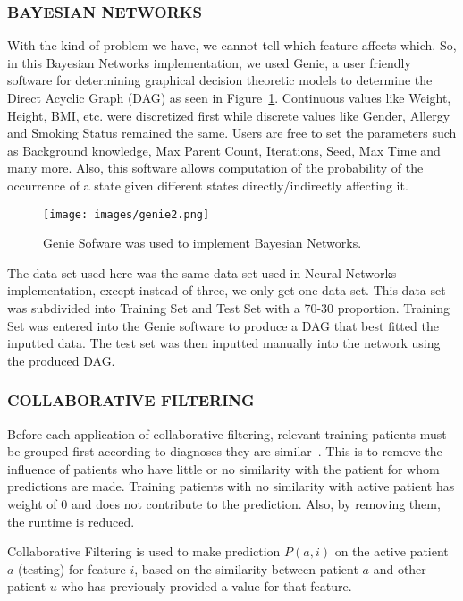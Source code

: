 \documentclass[journal]{./IEEE/IEEEtran}
\begin{document}
\subsubsection {BAYESIAN NETWORKS}

	With the kind of problem we have, we cannot tell which feature affects which. So, in this Bayesian Networks implementation, we used Genie, a user friendly software for determining graphical decision theoretic models to determine the Direct Acyclic Graph (DAG) as seen in Figure~\ref{fig:bayesian}.  Continuous values like Weight, Height, BMI, etc. were discretized first while discrete values like Gender, Allergy and Smoking Status remained the same. Users are free to set the parameters such as Background knowledge, Max Parent Count, Iterations, Seed, Max Time and many more. Also, this software allows computation of the probability of the occurrence of a state given different states directly/indirectly affecting it.

\begin{figure}[h]
\begin{center}
\texttt{[image: images/genie2.png]}
\caption{Genie Sofware was used to implement Bayesian Networks.}
\label{fig:bayesian}
\end{center}
\end{figure}

	The data set used here was the same data set used in Neural Networks implementation, except instead of three, we only get one data set. This data set was subdivided into Training Set and Test Set with a 70-30 proportion. Training Set was entered into the Genie software to produce a DAG that best fitted the inputted data. The test set was then inputted manually into the network using the produced DAG.


\subsubsection {COLLABORATIVE FILTERING}

	Before each application of collaborative filtering, relevant training patients must be grouped first according to diagnoses they are similar~\cite{Su09}. This is to remove the influence of patients who have little or no similarity with the patient for whom predictions are made. Training patients with no similarity with active patient has weight of 0 and does not contribute to the prediction. Also, by removing them, the runtime is reduced.

	Collaborative Filtering is used to make prediction $P(a,i)$ on the active patient $a$ (testing) for feature $i$, based on the similarity between patient $a$ and other patient $u$ who has previously provided a value for that feature. 
\end{document}
